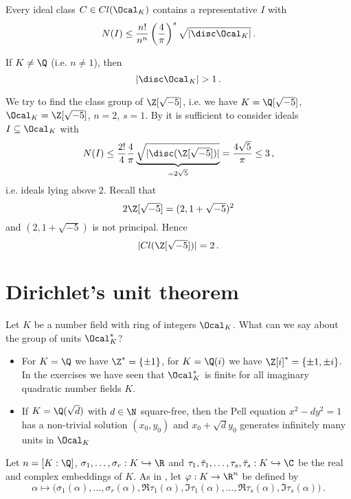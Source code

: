 \begin{cor}
	Every ideal class \( C \in Cl(\Ocal_K) \) contains a representative \( I \) with
	\[ N(I) \leq \frac{n!}{n^n} \left( \frac{4}{\pi} \right)^s \sqrt{|\disc \Ocal_K|} \,. \]
\end{cor}

\begin{cor}\label{thm:3.25}
	If \( K \neq \Q \) (i.e. \( n \neq 1 \)), then
	\[ |\disc \Ocal_K| > 1 \,. \]
\end{cor}

\begin{exmp*}
	We try to find the class group of \( \Z [\sqrt{-5}] \), i.e. we have \( K = \Q[\sqrt{-5}] \), \( \Ocal_K = \Z[\sqrt{-5}] \), \( n = 2 \), \( s=1 \).
	By  it is sufficient to consider ideals \( I \subseteq \Ocal_K \) with
	\[ N(I) \leq \frac{2!}{4} \frac{4}{\pi} \underbrace{\sqrt{|\disc(\Z[\sqrt{-5}])|}}_{= 2 \sqrt{5}} = \frac{4 \sqrt{5}}{\pi} \leq 3 \,, \]
	i.e. ideals lying above 2.
	Recall that
	\[ 2\Z[\sqrt{-5}] = (2, 1+\sqrt{-5})^2 \]
	and \( (2, 1 + \sqrt{-5}) \) is not principal.
	Hence
	\[ |Cl(\Z[\sqrt{-5}])| = 2 \,. \]
\end{exmp*}


\section{Dirichlet's unit theorem}\label{sec:3.4}

Let \( K \) be a number field with ring of integers \( \Ocal_K \).
What can we say about the group of units \( \Ocal_K^* \)?

\begin{exmp*}
	\begin{itemize}
		\item For \( K = \Q \) we have \( \Z^* = \{\pm 1\} \), for \( K = \Q(i) \) we have \( \Z[i]^* = \{\pm 1, \pm i\} \).
			In the exercises we have seen that \( \Ocal_K^* \) is finite for all imaginary quadratic number fields \( K \).
		\item If \( K = \Q(\sqrt{d}) \) with \( d \in \N \) square-free, then the Pell equation \( x^2 - dy^2 = 1 \) has a non-trivial solution \( (x_0, y_0) \) and \( x_0 + \sqrt{d}y_0 \) generates infinitely many units in \( \Ocal_K \)
	\end{itemize}
\end{exmp*}

Let \( n = [K:\Q] \), \( \sigma_1, \dotsc, \sigma_r: K \hookrightarrow \R \) and \( \tau_1, \bar{\tau}_1, \dotsc, \tau_s, \bar{\tau}_s: K \hookrightarrow \C \) be the real and complex embeddings of \( K \).
As in , let \( \varphi: K \to \R^n \) be defined by
\[ \alpha \mapsto \big( \sigma_1(\alpha), \dotsc, \sigma_r(\alpha), \Re \tau_1(\alpha), \Im \tau_1(\alpha), \dotsc, \Re \tau_s(\alpha), \Im \tau_s(\alpha) \big) \,. \]

